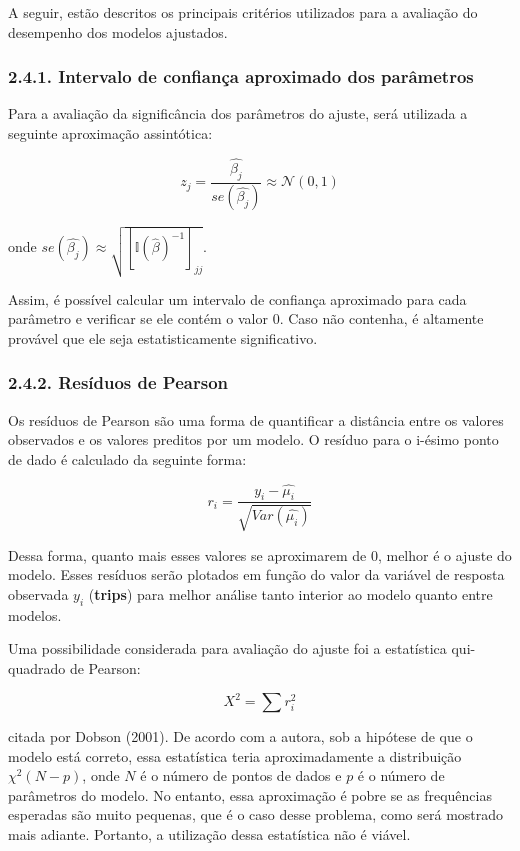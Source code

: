 \documentclass[
]{article}
\begin{document}
A seguir, estão descritos os principais critérios utilizados para a
avaliação do desempenho dos modelos ajustados.

\subsubsection{2.4.1. Intervalo de confiança aproximado dos
parâmetros}\label{intervalo-de-confianuxe7a-aproximado-dos-paruxe2metros}

Para a avaliação da significância dos parâmetros do ajuste, será
utilizada a seguinte aproximação assintótica:

\[
z_j = \dfrac{\hat{\beta_j}}{se(\hat{\beta_j})} \approx \mathcal{N}(0, 1)
\]

onde
\(se(\hat{\beta_j}) \approx \sqrt{[\mathbb{I}(\hat{\beta})^{-1}]_{jj}}\).

Assim, é possível calcular um intervalo de confiança aproximado para
cada parâmetro e verificar se ele contém o valor 0. Caso não contenha, é
altamente provável que ele seja estatisticamente significativo.

\subsubsection{2.4.2. Resíduos de Pearson}\label{resuxedduos-de-pearson}

Os resíduos de Pearson são uma forma de quantificar a distância entre os
valores observados e os valores preditos por um modelo. O resíduo para o
i-ésimo ponto de dado é calculado da seguinte forma:

\[
r_i = \dfrac{y_i - \hat{\mu_i}}{\sqrt{Var(\hat{\mu_i})}}
\]

Dessa forma, quanto mais esses valores se aproximarem de 0, melhor é o
ajuste do modelo. Esses resíduos serão plotados em função do valor da
variável de resposta observada \(y_i\) (\textbf{trips}) para melhor
análise tanto interior ao modelo quanto entre modelos.

Uma possibilidade considerada para avaliação do ajuste foi a estatística
qui-quadrado de Pearson:

\[
X^2 = \sum r_i^2
\]

citada por Dobson (2001). De acordo com a autora, sob a hipótese de que
o modelo está correto, essa estatística teria aproximadamente a
distribuição \(\chi^2(N-p)\), onde \(N\) é o número de pontos de dados e
\(p\) é o número de parâmetros do modelo. No entanto, essa aproximação é
pobre se as frequências esperadas são muito pequenas, que é o caso desse
problema, como será mostrado mais adiante. Portanto, a utilização dessa
estatística não é viável.
\end{document}
